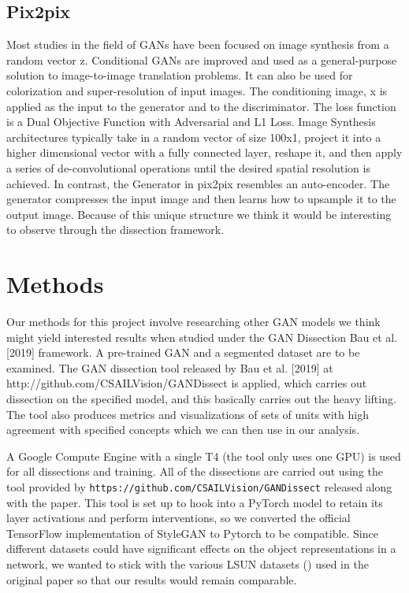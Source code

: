 \documentclass{article}
\begin{document}
\subsection{Pix2pix}
Most studies in the field of GANs have been focused on image synthesis from a random vector z. Conditional GANs are improved and used as a general-purpose solution to image-to-image translation problems. It can also be used for colorization and super-resolution of input images. The conditioning image, x is applied as the input to the generator and to the discriminator. The loss function is a Dual Objective Function with Adversarial and L1 Loss. Image Synthesis architectures typically take in a random vector of size 100x1, project it into a higher dimensional vector with a fully connected layer, reshape it, and then apply a series of de-convolutional operations until the desired spatial resolution is achieved. In contrast, the Generator in pix2pix resembles an auto-encoder. The generator compresses the input image and then learns how to upsample it to the output image. Because of this unique structure we think it would be interesting to observe through the dissection framework.

\section{Methods}
Our methods for this project involve researching other GAN models we think might yield interested results when studied under the GAN Dissection Bau et al. [2019] framework. A pre-trained GAN and a segmented dataset are to be examined. The GAN dissection tool released by Bau et al. [2019] at http://github.com/CSAILVision/GANDissect is applied, which carries out dissection on the specified model, and this basically carries out the heavy lifting. The tool also produces metrics and visualizations of sets of units with high agreement with specified concepts which we can then use in our analysis.

A Google Compute Engine with a single T4 (the tool only uses one GPU) is used for all dissections and training. All of the dissections are carried out using the tool provided by \cite{gandissect} \texttt{https://github.com/CSAILVision/GANDissect} released along with the paper. This tool is set up to hook into a PyTorch model to retain its layer activations and perform interventions, so we converted the official TensorFlow implementation of StyleGAN to Pytorch to be compatible. Since different datasets could have significant effects on the object representations in a network, we wanted to stick with the various LSUN datasets (\cite{lsun}) used in the original paper so that our results would remain comparable. 
\end{document}
